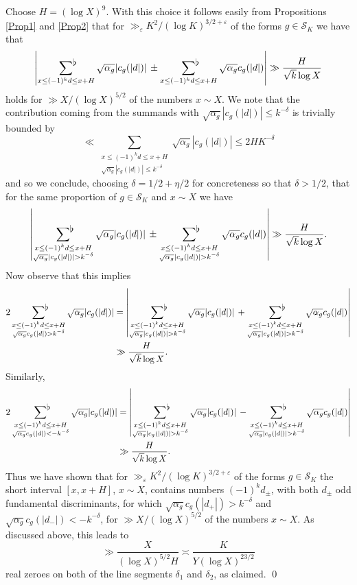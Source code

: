 \documentclass[a4paper,10pt,twoside]{amsart}
\theoremstyle{definition}
\numberwithin{equation}{section}
\newcommand\eps{\varepsilon}
\renewcommand\:{\colon}
\newcommand{\sumflat}{\mathop{{\sum}^{\raisebox{-3pt}{\makebox[0pt][l]{$\flat$}}}}}
\begin{document}
\noindent Choose $H=(\log X)^9$. With this choice it follows easily from Propositions \ref{Prop1} and \ref{Prop2} that for $\gg_\eps K^2/(\log K)^{3/2+\eps}$ of the forms $g\in\mathcal S_K$ we have that
\[ 
\left|\sumflat_{x\leq (-1)^kd\leq x+H}\sqrt{\alpha_g}|c_g(|d|)|\,\pm\sumflat_{x\leq (-1)^kd\leq x+H}\sqrt{\alpha_g}c_g(|d|)\right|\gg \frac H{\sqrt k \log X}\]
holds for $\gg X/(\log X)^{5/2}$ of the numbers $x\sim X$. We note that the contribution coming from the summands with $\sqrt{\alpha_g}|c_g(|d|)|\leq k^{-\delta}$ is trivially bounded by
\[\ll \sum_{\substack{x\leq (-1)^k d\leq x+H\\
\sqrt{\alpha_g} |c_g(|d|)|\leq k^{-\delta}}}\sqrt{\alpha_g}|c_g(|d|)|\leq 2HK^{-\delta}\]
and so we conclude, choosing $\delta=1/2+\eta/2$ for concreteness so that $\delta>1/2$, that for the same proportion of $g\in \mathcal S_K$ and $x\sim X$ we have
\[
\left|\sumflat_{\substack{x\leq (-1)^kd\leq x+H\\
\sqrt{\alpha_g}|c_g(|d|)|> k^{-\delta}}}\sqrt{\alpha_g}|c_g(|d|)|\,\pm\sumflat_{\substack{x\leq (-1)^kd\leq x+H\\
\sqrt{\alpha_g}|c_g(|d|)|> k^{-\delta}}}\sqrt{\alpha_g}c_g(|d|)\right|\gg \frac H{\sqrt k \log X}.\]
Now observe that this implies 
\begin{align*}
2\sumflat_{\substack{x\leq (-1)^kd\leq x+H\\
\sqrt{\alpha_g}c_g(|d|)> k^{-\delta}}}\sqrt{\alpha_g}|c_g(|d|)|&=\left|\sumflat_{\substack{x\leq (-1)^kd\leq x+H\\
\sqrt{\alpha_g}|c_g(|d|)|> k^{-\delta}}}\sqrt{\alpha_g}|c_g(|d|)|\,+\sumflat_{\substack{x\leq (-1)^kd\leq x+H\\
\sqrt{\alpha_g}|c_g(|d|)|> k^{-\delta}}}\sqrt{\alpha_g}c_g(|d|)\right|\\
&\gg \frac H{\sqrt k \log X}.
\end{align*}
Similarly,
\begin{align*}
2\sumflat_{\substack{x\leq (-1)^kd\leq x+H\\
\sqrt{\alpha_g}c_g(|d|)< -k^{-\delta}}}\sqrt{\alpha_g}|c_g(|d|)|&=\left|\sumflat_{\substack{x\leq (-1)^kd\leq x+H\\
\sqrt{\alpha_g}|c_g(|d|)|> k^{-\delta}}}\sqrt{\alpha_g}|c_g(|d|)|\,-\sumflat_{\substack{x\leq (-1)^kd\leq x+H\\
\sqrt{\alpha_g}|c_g(|d|)|> k^{-\delta}}}\sqrt{\alpha_g}c_g(|d|)\right|\\
&\gg \frac H{\sqrt k \log X}.
\end{align*}
Thus we have shown that for $\gg_\eps K^2/(\log K)^{3/2+\eps}$ of the forms $g\in\mathcal S_K$ the short interval $[x,x+H]$, $x\sim X$, contains numbers $(-1)^k d_\pm$, with both $d_\pm$ odd fundamental discriminants, for which $\sqrt{\alpha_g}c_g(|d_+|)>k^{-\delta}$ and $\sqrt{\alpha_g}c_g(|d_-|)<-k^{-\delta}$, for $\gg X/(\log X)^{5/2}$ of the numbers $x\sim X$. As discussed above, this leads to 
\[ 
\gg \frac X{(\log X)^{5/2}H}\asymp\frac{K}{Y(\log X)^{23/2}}\]
real zeroes on both of the line segments $\delta_1$ and $\delta_2$, as claimed. \qed \\
\end{document}
